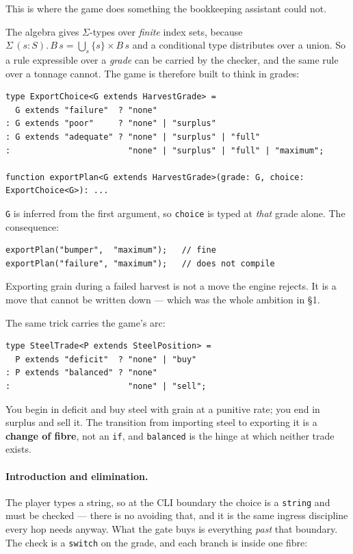 \documentclass[11pt,a4paper]{article}
\begin{document}
This is where the game does something the bookkeeping assistant could not.

The algebra gives $\Sigma$-types over \emph{finite} index sets, because
$\Sigma\,(s : S).\,B\,s = \bigcup_{s} \{s\} \times B\,s$ and a conditional type
distributes over a union. So a rule expressible over a \emph{grade} can be
carried by the checker, and the same rule over a tonnage cannot. The game is
therefore built to think in grades:

\begin{lstlisting}[language=TS]
type ExportChoice<G extends HarvestGrade> =
  G extends "failure"  ? "none"
: G extends "poor"     ? "none" | "surplus"
: G extends "adequate" ? "none" | "surplus" | "full"
:                        "none" | "surplus" | "full" | "maximum";

function exportPlan<G extends HarvestGrade>(grade: G, choice: ExportChoice<G>): ...
\end{lstlisting}

\noindent \verb|G| is inferred from the first argument, so \verb|choice| is
typed at \emph{that} grade alone. The consequence:

\begin{lstlisting}[language=TS]
exportPlan("bumper",  "maximum");   // fine
exportPlan("failure", "maximum");   // does not compile
\end{lstlisting}

Exporting grain during a failed harvest is not a move the engine rejects. It is
a move that cannot be written down --- which was the whole ambition in \S1.

The same trick carries the game's arc:

\begin{lstlisting}[language=TS]
type SteelTrade<P extends SteelPosition> =
  P extends "deficit"  ? "none" | "buy"
: P extends "balanced" ? "none"
:                        "none" | "sell";
\end{lstlisting}

\noindent You begin in deficit and buy steel with grain at a punitive rate; you
end in surplus and sell it. The transition from importing steel to exporting it
is a \textbf{change of fibre}, not an \verb|if|, and \texttt{balanced} is the
hinge at which neither trade exists.

\paragraph{Introduction and elimination.} The player types a string, so at the
CLI boundary the choice is a \verb|string| and must be checked --- there is no
avoiding that, and it is the same ingress discipline every hop needs anyway.
What the gate buys is everything \emph{past} that boundary. The check is a
\verb|switch| on the grade, and each branch is inside one fibre:
\end{document}
